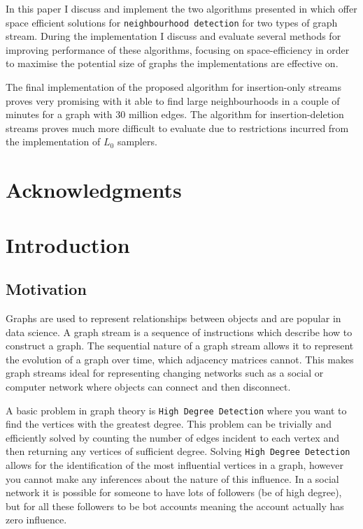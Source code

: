 \documentclass[11pt,twoside,a4paper]{report}
\begin{document}
\par In this paper I discuss and implement the two algorithms presented in \cite{orig} which offer space efficient solutions for \texttt{neighbourhood detection} for two types of graph stream. During the implementation I discuss and evaluate several methods for improving performance of these algorithms, focusing on space-efficiency in order to maximise the potential size of graphs the implementations are effective on.

\par The final implementation of the proposed algorithm for insertion-only streams proves very promising with it able to find large neighbourhoods in a couple of minutes for a graph with 30 million edges. The algorithm for insertion-deletion streams proves much more difficult to evaluate due to restrictions incurred from the implementation of $L_0$ samplers.

\chapter*{Acknowledgments}

\renewcommand\thechapter{\Roman{chapter}}
\renewcommand\thesection{\thechapter.\roman{section}}
\setcounter{chapter}{1}
\chapter*{Introduction}

\section{Motivation}

Graphs are used to represent relationships between objects and are popular in data science. A graph stream is a sequence of instructions which describe how to construct a graph. The sequential nature of a graph stream allows it to represent the evolution of a graph over time, which adjacency matrices cannot. This makes graph streams ideal for representing changing networks such as a social or computer network where objects can connect and then disconnect.

\par A basic problem in graph theory is \texttt{High Degree Detection} where you want to find the vertices with the greatest degree. This problem can be trivially and efficiently solved by counting the number of edges incident to each vertex and then returning any vertices of sufficient degree. Solving \texttt{High Degree Detection} allows for the identification of the most influential vertices in a graph, however you cannot make any inferences about the nature of this influence. In a social network it is possible for someone to have lots of followers (\ie be of high degree), but for all these followers to be bot accounts meaning the account actually has zero influence.
\end{document}
